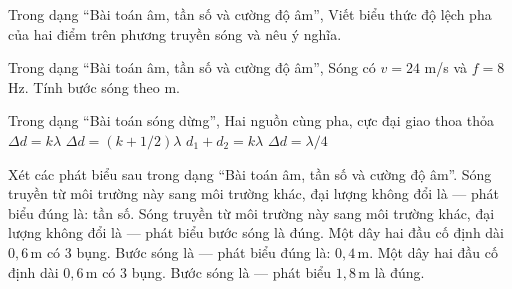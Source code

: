 \begin{ex}
Trong dạng “Bài toán âm, tần số và cường độ âm”, Viết biểu thức độ lệch pha của hai điểm trên phương truyền sóng và nêu ý nghĩa.
\choiceTF

\end{ex}

\begin{ex}
Trong dạng “Bài toán âm, tần số và cường độ âm”, Sóng có $v=24$ m/s và $f=8$ Hz. Tính bước sóng theo m.
\end{ex}

\begin{ex}
Trong dạng “Bài toán sóng dừng”, Hai nguồn cùng pha, cực đại giao thoa thỏa
\choice
{\True $\Delta d=k\lambda$}
{$\Delta d=(k+1/2)\lambda$}
{$d_1+d_2=k\lambda$}
{$\Delta d=\lambda/4$}
\end{ex}

\begin{ex}
Xét các phát biểu sau trong dạng “Bài toán âm, tần số và cường độ âm”.
\choiceTF
{\True Sóng truyền từ môi trường này sang môi trường khác, đại lượng không đổi là — phát biểu đúng là: tần số.}
{Sóng truyền từ môi trường này sang môi trường khác, đại lượng không đổi là — phát biểu bước sóng là đúng.}
{\True Một dây hai đầu cố định dài $0,6\,\text{m}$ có 3 bụng. Bước sóng là — phát biểu đúng là: $0,4\,\text{m}$.}
{Một dây hai đầu cố định dài $0,6\,\text{m}$ có 3 bụng. Bước sóng là — phát biểu $1,8\,\text{m}$ là đúng.}
\end{ex}

